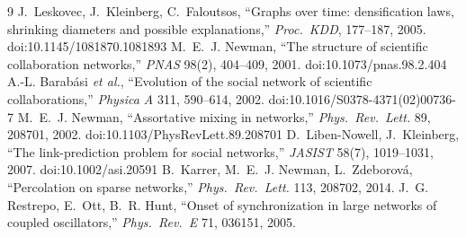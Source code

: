 \documentclass[10pt,twocolumn,a4paper]{article}
\begin{document}
{\footnotesize
\begin{thebibliography}{9}\setlength{\itemsep}{0pt}
 J.~Leskovec, J.~Kleinberg, C.~Faloutsos, ``Graphs over time: densification laws, shrinking diameters and possible explanations,'' \emph{Proc.\ KDD}, 177--187, 2005. doi:10.1145/1081870.1081893
 M.~E.~J. Newman, ``The structure of scientific collaboration networks,'' \emph{PNAS} 98(2), 404--409, 2001. doi:10.1073/pnas.98.2.404
 A.-L. Barab\'asi \emph{et al.}, ``Evolution of the social network of scientific collaborations,'' \emph{Physica A} 311, 590--614, 2002. doi:10.1016/S0378-4371(02)00736-7
 M.~E.~J. Newman, ``Assortative mixing in networks,'' \emph{Phys.\ Rev.\ Lett.} 89, 208701, 2002. doi:10.1103/PhysRevLett.89.208701
 D.~Liben-Nowell, J.~Kleinberg, ``The link-prediction problem for social networks,'' \emph{JASIST} 58(7), 1019--1031, 2007. doi:10.1002/asi.20591
 B.~Karrer, M.~E.~J. Newman, L.~Zdeborov\'a, ``Percolation on sparse networks,'' \emph{Phys.\ Rev.\ Lett.} 113, 208702, 2014.
 J.~G. Restrepo, E.~Ott, B.~R. Hunt, ``Onset of synchronization in large networks of coupled oscillators,'' \emph{Phys.\ Rev.\ E} 71, 036151, 2005.
\end{thebibliography}}
\end{document}
